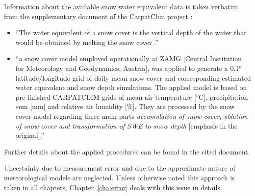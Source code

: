 Information about the available snow water equivalent data is taken verbatim from the supplementary document of the CarpatClim project \citep{Szalai2013}:
\begin{itemize}
	\item[] ``The water equivalent of a snow cover is the vertical depth of the water that would be obtained by melting the snow cover \citep{WMO2008}.''
	\item[] ``a snow cover model employed operationally at ZAMG [Central Institution for Meteorology and Geodynamics, Austria], was applied to generate a 0.1° latitude/longitude grid of daily mean snow cover and corresponding estimated water equivalent and snow depth simulations. The applied model is based on pre-finished CARPATCLIM grids of mean air temperature [°C], precipitation sum [mm] and relative air humidity [\%]. They are processed by the snow cover model regarding three main parts \textit{accumulation of snow cover, ablation of snow cover and transformation of SWE to snow depth} [emphasis in the original].''
\end{itemize}
Further details about the applied procedures can be found in the cited document.

Uncertainty due to measurement error and due to the approximate nature of meteorological models are neglected. Unless otherwise noted this approach is taken in all chapters, Chapter~\ref{cha:error} deals with this issue in details.



